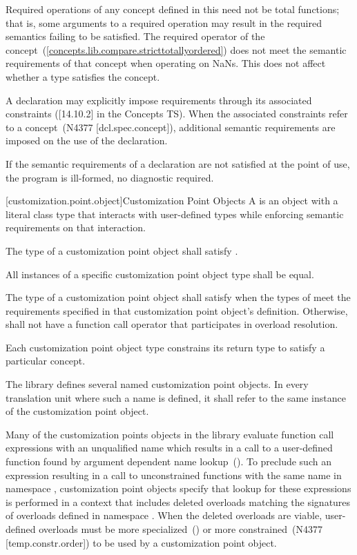 {\color{newclr}
\pnum
Required operations of any concept defined in this  need not be
total functions; that is, some arguments to a required operation may
result in the required semantics failing to be satisfied. \enterexample
The required \tcode{<} operator of the 
concept~(\ref{concepts.lib.compare.stricttotallyordered}) does not meet the
semantic requirements of that concept when operating on NaNs.\exitexample
This does not affect whether a type satisfies the concept.

\pnum
A declaration may explicitly impose requirements through its associated
constraints ([14.10.2] in the Concepts TS). When the associated constraints
refer to a concept~(N4377 [dcl.spec.concept]), additional semantic requirements are
imposed on the use of the declaration.

\pnum
If the semantic requirements of a declaration are not satisfied at the
point of use, the program is ill-formed, no diagnostic required.
}

\setcounter{section}{5}
\setcounter{subsection}{2}
\setcounter{subsubsection}{1}
\setcounter{paragraph}{4}

{\color{newclr}
[customization.point.object]{Customization Point Objects}
\pnum
A  is an object with a
literal class type that interacts with user-defined types while
enforcing semantic requirements on that interaction.

\pnum
The type of a customization point object shall satisfy
.

\pnum
All instances of a specific customization point object type shall
be equal.

\pnum
The type of a customization point object  shall satisfy
 when the types of
 meet the requirements specified in that
customization point object's definition. Otherwise, 
shall not have a function call operator that participates in
overload resolution.

\pnum
Each customization point object type constrains its return type
to satisfy a particular concept.

\pnum
The library defines several named customization point objects.
In every translation unit where such a name is defined, it shall
refer to the same instance of the customization point object.

\pnum
\enternote Many of the customization points objects in the library
evaluate function call expressions with an unqualified name which
results in a call to a user-defined function found by argument
dependent name lookup~(). To preclude
such an expression resulting in a call to unconstrained functions
with the same name in namespace , customization point
objects specify that lookup for these expressions is performed in
a context that includes deleted overloads matching the signatures
of overloads defined in namespace . When the deleted
overloads are viable, user-defined overloads must be more
specialized~() or more
constrained~(N4377 [temp.constr.order])  to be used by a
customization point object. \exitnote
} %
